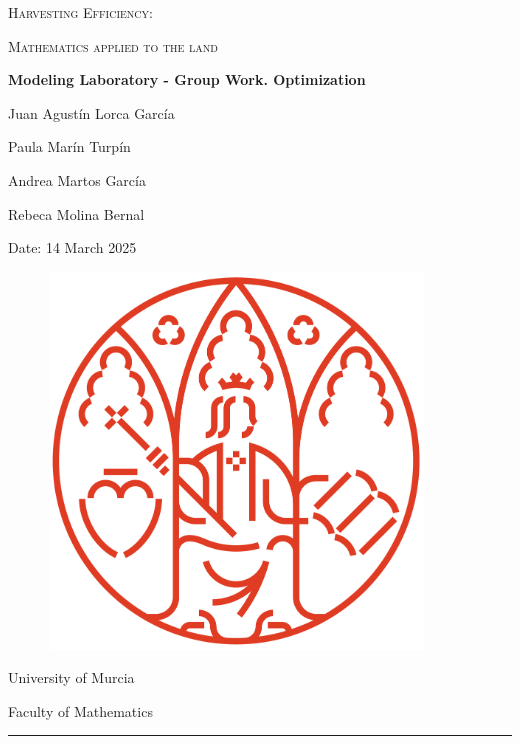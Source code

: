\begin{titlepage}
    \begin{center}
        {\Huge \textsc{Harvesting Efficiency:}}

        {\Huge \textsc{Mathematics applied to the land}}  
        
        
        {\Large{\textbf{Modeling Laboratory - Group Work. Optimization}}}
        
        \vspace{20mm}
        {\large{ 
          Juan Agustín Lorca García

          Paula Marín Turpín
          
          Andrea Martos García

          Rebeca Molina Bernal
          
          Date: 14 March 2025 
          }}

          \vspace{20mm}
        \begin{figure}[ht]
             \centerline{\includegraphics[width=10cm,height=10cm]{portada/nuevo_logo_umu.png}}
            \label{logo_umu}
        \end{figure}

        \vspace{20mm}
        {\large {University of Murcia}}
        
        {\large {Faculty of Mathematics}}
        \textcolor{rojo}{\rule{\linewidth}{0.55mm}}
    \end{center}
\end{titlepage}